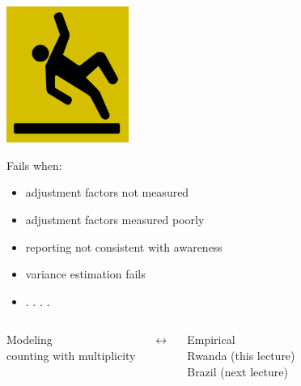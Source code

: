 \documentclass[aspectratio=169]{beamer}
\begin{document}
\begin{frame}

\begin{center}
\includegraphics[width=0.3\textwidth]{figures/slippery-when-wet}
\end{center}

Fails when:
\begin{itemize}
\item adjustment factors not measured
\item adjustment factors measured poorly
\item reporting not consistent with awareness
\item variance estimation fails
\item  . . . .
\end{itemize}

\end{frame}
\begin{frame}

\begin{columns}[t] %

\begin{center}
{\Large Modeling}\\
counting with multiplicity
\end{center}

\begin{center}
{\Large $\leftrightarrow$}
\end{center}

\begin{center}
{\Large Empirical}\\
Rwanda (this lecture)\\
Brazil (next lecture) \\
\end{center}
\end{columns}

\end{frame}
\end{document}

